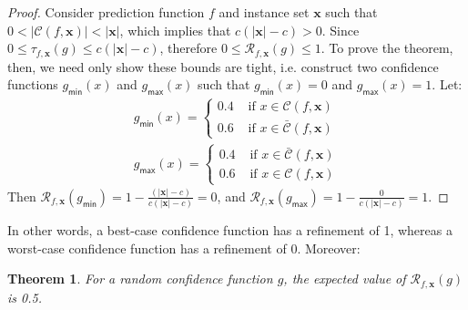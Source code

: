 \documentclass[11pt]{article}
\newtheorem{theorem}{Theorem}
\begin{document}
\begin{proof}
	Consider prediction function $f$ and instance set $\mathbf{x}$ such that $0 < |\mathcal{C}(f, \mathbf{x})| < |\mathbf{x}|$, which implies that $c(|\mathbf{x}|-c) > 0$. Since $0 \leq \tau_{f, \mathbf{x}}(g) \leq c(|\mathbf{x}|-c)$, therefore $0 \leq \mathcal{R}_{f, \mathbf{x}}(g) \leq 1$. To prove the theorem, then, we need only show these bounds are tight, i.e. construct two confidence functions $g_\mathsf{min}(x)$ and  $g_\mathsf{max}(x)$ such that $g_\mathsf{min}(x) = 0$ and $g_\mathsf{max}(x) = 1$. Let:
	\begin{gather*}
	g_\mathsf{min}(x) = \begin{cases}
               0.4 &\mbox{ if } x \in \mathcal{C}(f, \mathbf{x})\\
               0.6 &\mbox{ if } x \in \bar{\mathcal{C}}(f, \mathbf{x})
       \end{cases}\\
	g_\mathsf{max}(x) = \begin{cases}
               0.4 &\mbox{ if } x \in \bar{\mathcal{C}}(f, \mathbf{x})\\
               0.6 &\mbox{ if } x \in  \mathcal{C}(f, \mathbf{x})
                   \end{cases}
	\end{gather*}
	 Then $\mathcal{R}_{f, \mathbf{x}}(g_\mathsf{min}) = 1-\frac{(|\mathbf{x}|-c)}{c(|\mathbf{x}|-c)} = 0$, and $\mathcal{R}_{f, \mathbf{x}}(g_\mathsf{max}) = 1-\frac{0}{c(|\mathbf{x}|-c)} = 1$. 
\end{proof}

\noindent In other words, a best-case confidence function has a refinement of 1, whereas a worst-case confidence function has a refinement of 0. Moreover:

\begin{theorem}
	For a random confidence function $g$, the expected value of $\mathcal{R}_{f, \mathbf{x}}(g)$ is 0.5.
\label{thm:expected}
\end{theorem}
\end{document}
